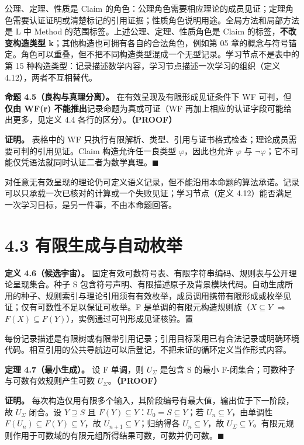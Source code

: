 \documentclass[UTF8,a4paper,zihao=-4,fontset=windows,openany]{ctexbook}
\newcommand{\mcsdisplay}[1]{%
  \par\addvspace{0.7em}%
  \sbox{\mcsmathbox}{\ensuremath{\displaystyle #1}}%
  \ifdim\wd\mcsmathbox>\linewidth
    \noindent\resizebox{\linewidth}{!}{\usebox{\mcsmathbox}}%
  \else
    \noindent\hspace*{\fill}\usebox{\mcsmathbox}\hspace*{\fill}%
  \fi
  \par\addvspace{0.7em}%
}
\def\ensuremath#1{#1}%
\begin{document}
公理、定理、性质是 Claim 的角色：公理角色需要相应理论的成员见证；定理角色需要认证证明或清楚标记的引用证据；性质角色说明用途。全局方法和局部方法是 L 中 Method 的范围标签。上述公理、定理、性质角色是 Claim 的标签，\textbf{不改变构造类型 k}；其他构造也可拥有各自的合法角色，例如第 05 章的概念与符号锚定。角色可以重叠，但不把不同构造类型混成一个无型记录。学习节点不是表中的第 15 种构造类型：记录描述数学内容，学习节点描述一次学习的组织（定义 4.12），两者不互相替代。

\textbf{命题 4.5（良构与真理分离）。} 在有效呈现及有限形成见证条件下 WF 可判，但\textbf{仅由 WF(r) 不能推出}记录命题为真或可证（WF 再加上相应的认证字段可能给出更多，见定义 4.4 各行的区分）。\textbf{（PROOF）}

\textbf{证明。} 表格中的 WF 只执行有限解析、类型、引用与证书格式检查；理论成员需要可判的引用见证。Claim 构造允许任一良类型 \(\varphi\)，因此也允许 \(\varphi\) 与 \(\neg\varphi\)；它不可能仅凭语法就同时认证二者为数学真理。\(\blacksquare\)

对任意无有效呈现的理论仍可定义语义记录，但不能沿用本命题的算法承诺。记录可以只承载一次已核对的计算或一个失败见证；学习节点（定义 4.12）能否满足一次学习目标，是另一件事，不由本命题回答。

\section{4.3 有限生成与自动枚举}
\textbf{定义 4.6（候选宇宙）。} 固定有效可数符号表、有限字符串编码、规则表与公开理论呈现集合。种子 S 包含符号声明、有限描述原子及背景模块代码。自动生成所用的种子、规则索引与理论引用须有有效枚举，成员调用携带有限形成或枚举见证；仅有可数性不足以保证可枚举。F 是单调的有限元构造规则族（\(X\subseteq Y\) \(\Longrightarrow\) \(F(X)\subseteq F(Y)\)），实例通过可判形成见证核验。置


\mcsdisplay{U_0=S,\qquad U_{n+1}=U_n\cup F(U_n),\qquad
U_\Sigma=\bigcup_{n<\omega}U_n.}
\noindent 每份记录描述是有限树或有限带引用记录；引用目标采用已有合法记录或明确环境代码。相互引用的公共导航边可以后登记，不把未证的循环定义当作形式内容。

\textbf{定理 4.7（最小生成）。} 设 F 单调，则 \(U_\Sigma\) 是包含 S 的最小 F-闭集合；可数种子与可数有效规则产生可数 \(U_\Sigma\)。\textbf{（PROOF）}

\textbf{证明。} 每次构造仅用有限多个输入，其阶段编号有最大值，输出位于下一阶段，故 \(U_\Sigma\) 闭合。设 \(Y\supseteq S\) 且 \(F(Y)\subseteq Y\)：\(U_0=S\subseteq Y\)；若 \(U_n\subseteq Y\)，由单调性 \(F(U_n)\subseteq F(Y)\subseteq Y\)，故 \(U_{n+1}\subseteq Y\)；归纳得各 \(U_n\subseteq Y\)，故 \(U_\Sigma\subseteq Y\)。有限元规则作用于可数域的有限元组所得结果可数，可数并仍可数。\(\blacksquare\)
\end{document}

